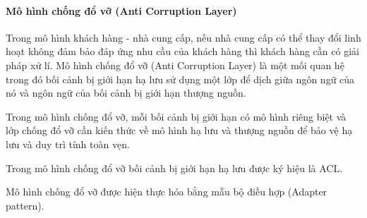 \paragraph{Mô hình chống đổ vỡ (Anti Corruption Layer)}       







Trong mô hình khách hàng - nhà cung cấp, nếu nhà cung cấp có thể thay đổi linh hoạt không đảm bảo đáp ứng nhu cầu của khách hàng thì khách hàng cần có giải pháp xử lí. Mô hình chống đổ vỡ (Anti Corruption Layer) là một mối quan hệ trong đó bối cảnh bị giới hạn hạ lưu sử dụng một lớp để dịch giữa ngôn ngữ của nó và ngôn ngữ của bối cảnh bị giới hạn thượng nguồn.

Trong mô hình chống đổ vỡ, mỗi bối cảnh bị giới hạn có mô hình riêng biệt và lớp chống đổ vỡ cần kiến thức về mô hình hạ lưu và thượng nguồn để bảo vệ hạ lưu và duy trì tính toàn vẹn. 


Trong mô hình chống đổ vỡ bối cảnh bị giới hạn hạ lưu được ký hiệu là ACL.



Mô hình chống đổ vỡ được hiện thực hóa bằng   mẫu bộ điều hợp  (Adapter pattern).




















